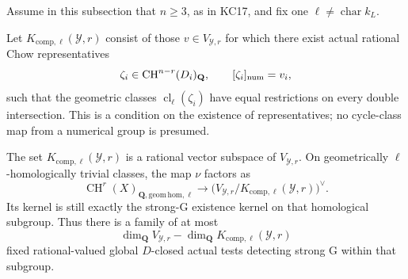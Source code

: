 Assume in this subsection that $n\ge3$, as in KC17, and
fix one $\ell\ne\operatorname{char}k_L$.

\begin{definition}
\label{r17fd:compatible}
Let $K_{\mathrm{comp},\ell}(\mathcal Y,r)$ consist of those
$v\in V_{\mathcal Y,r}$ for which there exist actual rational
Chow representatives
\[
          \zeta_i\in\operatorname{CH}^{n-r}(D_i)_{\mathbf Q},
          \qquad [\zeta_i]_{\rm num}=v_i,
\]
such that the geometric classes $\operatorname{cl}_\ell(\zeta_i)$
have equal restrictions on every double intersection.
This is a condition on the existence of representatives;
no cycle-class map from a numerical group is presumed.
\end{definition}

\begin{proposition}
\label{r17fd:homological-refinement}
The set $K_{\mathrm{comp},\ell}(\mathcal Y,r)$ is a rational
vector subspace of $V_{\mathcal Y,r}$. On geometrically
$\ell$-homologically trivial classes, the map $\nu$ factors as
\[
 \operatorname{CH}^r(X)_{\mathbf Q,\mathrm{geom\,hom},\ell}
   \longrightarrow
   \bigl(V_{\mathcal Y,r}/K_{\mathrm{comp},\ell}(\mathcal Y,r)\bigr)^\vee.
 \tag{FD17.12}\label{r17fd:residual-map}
\]
Its kernel is still exactly the strong-G existence kernel
on that homological subgroup. Thus there is a family of at
most
\[
       \dim_{\mathbf Q}V_{\mathcal Y,r}
          -\dim_{\mathbf Q}K_{\mathrm{comp},\ell}(\mathcal Y,r)
 \tag{FD17.13}\label{r17fd:residual-number}
\]
fixed rational-valued global $D$-closed actual tests detecting
strong G within that subgroup.
\end{proposition}


